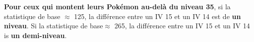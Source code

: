 \documentclass[12pt]{beamer}
\begin{document}
\begin{frame}
\begin{block}{}
\begin{footnotesize}
\textbf{Pour ceux qui montent leurs Pokémon au-delà du niveau 35}, si la statistique de base $\approx$ 125, la différence entre un IV 15 et un IV 14 est de \textbf{un niveau}. Si la statistique de base$\approx$ 265, la différence entre un IV 15 et un IV 14 is \textbf{un demi-niveau}.  



\end{footnotesize}
\end{block}
\end{frame}
\end{document}
